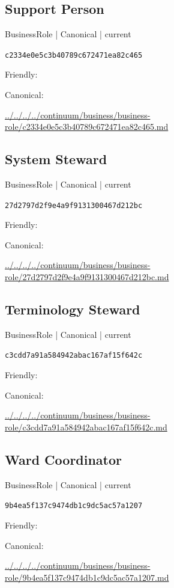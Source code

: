 \documentclass[10pt,a4paper]{article}
\begin{document}
\subsection*{Support Person}
{\small BusinessRole | Canonical | current}\par
\texttt{c2334e0e5c3b40789c672471ea82c465}\par
Friendly: \par
Canonical: \par
{\footnotesize\url{../../../../continuum/business/business-role/c2334e0e5c3b40789c672471ea82c465.md}}\par
\subsection*{System Steward}
{\small BusinessRole | Canonical | current}\par
\texttt{27d2797d2f9e4a9f9131300467d212bc}\par
Friendly: \par
Canonical: \par
{\footnotesize\url{../../../../continuum/business/business-role/27d2797d2f9e4a9f9131300467d212bc.md}}\par
\subsection*{Terminology Steward}
{\small BusinessRole | Canonical | current}\par
\texttt{c3cdd7a91a584942abac167af15f642c}\par
Friendly: \par
Canonical: \par
{\footnotesize\url{../../../../continuum/business/business-role/c3cdd7a91a584942abac167af15f642c.md}}\par
\subsection*{Ward Coordinator}
{\small BusinessRole | Canonical | current}\par
\texttt{9b4ea5f137c9474db1c9dc5ac57a1207}\par
Friendly: \par
Canonical: \par
{\footnotesize\url{../../../../continuum/business/business-role/9b4ea5f137c9474db1c9dc5ac57a1207.md}}\par
\end{document}

